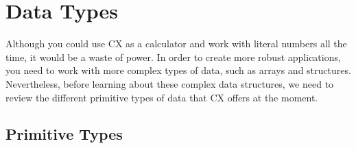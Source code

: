 \documentclass[11pt,fleqn,openany]{book} %
\begin{document}


\chapter{Data Types}
\label{chapter:data-types}


Although you could use CX as a calculator and work with literal numbers all the time, it would be a waste of power. In order to create more robust applications, you need to work with more complex types of data, such as arrays and structures. Nevertheless, before learning about these complex data structures, we need to review the different primitive types of data that CX offers at the moment.

\section{Primitive Types}

\end{document}
